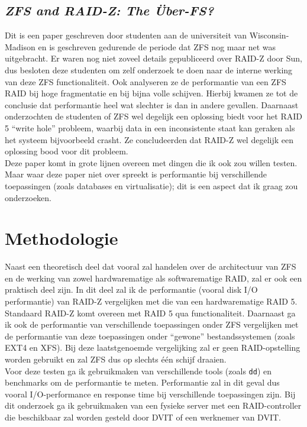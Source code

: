 \documentclass[fleqn,10pt]{voorstel}
\begin{document}
\subsection{\textit{ZFS and RAID-Z: The \"{U}ber-FS?} \autocite{BrianHickmann2007}}

Dit is een paper geschreven door studenten aan de universiteit van Wisconsin-Madison en is geschreven gedurende de periode dat ZFS nog maar net was uitgebracht. Er waren nog niet zoveel details gepubliceerd over RAID-Z door Sun, dus besloten deze studenten om zelf onderzoek te doen naar de interne werking van deze ZFS functionaliteit. Ook analyseren ze de performantie van een ZFS RAID bij hoge fragmentatie en bij bijna volle schijven. Hierbij kwamen ze tot de conclusie dat performantie heel wat slechter is dan in andere gevallen. Daarnaast onderzochten de studenten of ZFS wel degelijk een oplossing biedt voor het RAID 5 ``write hole'' probleem, waarbij data in een inconsistente staat kan geraken als het systeem bijvoorbeeld crasht. Ze  concludeerden dat RAID-Z wel degelijk een oplossing bood voor dit probleem. \\
Deze paper komt in grote lijnen overeen met dingen die ik ook zou willen testen. Maar waar deze paper niet over spreekt is performantie bij verschillende toepassingen (zoals databases en virtualisatie); dit is een aspect dat ik graag zou onderzoeken.

\section{Methodologie}
\label{sec:methodologie}


Naast een theoretisch deel dat vooral zal handelen over de architectuur van ZFS en de werking van zowel hardwarematige als softwarematige RAID, zal er ook een praktisch deel zijn. In dit deel zal ik de performantie (vooral disk I/O performantie) van RAID-Z vergelijken met die van een hardwarematige RAID 5. Standaard RAID-Z komt overeen met RAID 5 qua functionaliteit. Daarnaast ga ik ook de performantie van verschillende toepassingen onder ZFS vergelijken met de performantie van deze toepassingen onder ``gewone'' bestandssystemen (zoals EXT4 en XFS). Bij deze laatstgenoemde vergelijking zal er geen RAID-opstelling worden gebruikt en zal ZFS dus op slechts één schijf draaien. \\
Voor deze testen ga ik gebruikmaken van verschillende tools (zoals \texttt{dd}) en benchmarks om de performantie te meten. Performantie zal in dit geval dus vooral I/O-performance en response time bij verschillende toepassingen zijn.  Bij dit onderzoek ga ik gebruikmaken van een fysieke server met een RAID-controller die beschikbaar zal worden gesteld door DVIT of een werknemer van DVIT.
\end{document}
